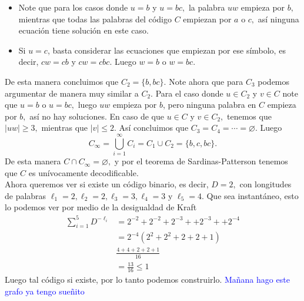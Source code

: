 \begin{sols}
    \begin{itemize}
        \item Note que para los casos donde $u=b$ y $u=bc,$ la palabra $uw$ empieza por $b,$ mientras que todas las palabras del código $C$ empiezan por $a$ o $c,$ así ninguna ecuación tiene solución en este caso.
        \item Si $u=c$, basta considerar las ecuaciones que empiezan por ese símbolo, es decir, $cw=cb$ y $cw=cbc.$ Luego $w=b$ o $w=bc.$
    \end{itemize}
    De esta manera concluimos que $C_2=\{b,bc\}.$ Note ahora que para $C_3$ podemos argumentar de manera muy similar a $C_2.$ Para el caso donde $u\in C_2$ y $v\in C$ note que $u=b$ o $u=bc,$ luego $uw$ empieza por $b$, pero ninguna palabra en $C$ empieza por $b,$ así no hay soluciones. En caso de que $u\in C$ y $v\in C_2,$ tenemos que $|uw|\geq 3,$ mientras que $|v|\leq 2.$ Así concluimos que $C_3=C_4=\cdots=\varnothing.$ Luego
    $$C_\infty=\bigcup_{i=1}^\infty C_i=C_1\cup C_2=\{b,c,bc\}.$$
    De esta manera $C\cap C_\infty=\varnothing,$ y por el teorema de Sardinas-Patterson tenemos que $C$ es unívocamente decodificable.\\

    Ahora queremos ver si existe un código binario, es decir, $D=2,$ con longitudes de palabras $\ell_1=2,\ell_2=2,\ell_3=3,\ell_4=3$ y $\ell_5=4.$ Que sea instantáneo, esto lo podemos ver por medio de la desigualdad de Kraft
    \begin{align*}
        \sum_{i=1}^5D^{-\ell_i}&=2^{-2}+2^{-2}+2^{-3}++2^{-3}++2^{-4}\\
        &=2^{-4}(2^2+2^2+2+2+1)\\
        &\frac{4+4+2+2+1}{16}\\
        &=\frac{13}{16}\leq 1
    \end{align*}
    Luego tal código si existe, por lo tanto podemos construirlo.
    \textcolor{blue}{Mañana hago este grafo ya tengo sueñito}
\end{sols}
